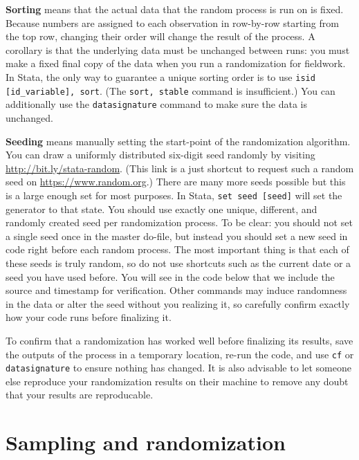 \textbf{Sorting} means that the actual data that the random process is run on is fixed.
Because numbers are assigned to each observation in row-by-row starting from
the top row,
changing their order will change the result of the process.
A corollary is that the underlying data must be unchanged between runs:
you must make a fixed final copy of the data when you run a randomization for fieldwork.
In Stata, the only way to guarantee a unique sorting order is to use
\texttt{isid [id\_variable], sort}. (The \texttt{sort, stable} command is insufficient.)
You can additionally use the \texttt{datasignature} command to make sure the
data is unchanged.

\textbf{Seeding} means manually setting the start-point of the randomization algorithm.
You can draw a uniformly distributed six-digit seed randomly by visiting \url{http://bit.ly/stata-random}.
(This link is a just shortcut to request such a random seed on \url{https://www.random.org}.)
There are many more seeds possible but this is a large enough set for most purposes.
In Stata, \texttt{set seed [seed]} will set the generator to that state.
You should use exactly one unique, different, and randomly created seed per randomization process.
To be clear: you should not set a single seed once in the master do-file,
but instead you should set a new seed in code right before each random process.
The most important thing is that each of these seeds is truly random,
so do not use shortcuts such as the current date or a seed you have used before.
You will see in the code below that we include the source and timestamp for verification.
Other commands may induce randomness in the data or alter the seed without you realizing it,
so carefully confirm exactly how your code runs before finalizing it.

To confirm that a randomization has worked well before finalizing its results,
save the outputs of the process in a temporary location,
re-run the code, and use \texttt{cf} or \texttt{datasignature} to ensure
nothing has changed. It is also advisable to let someone else reproduce your
randomization results on their machine to remove any doubt that your results
are reproducable.


\section{Sampling and randomization}


